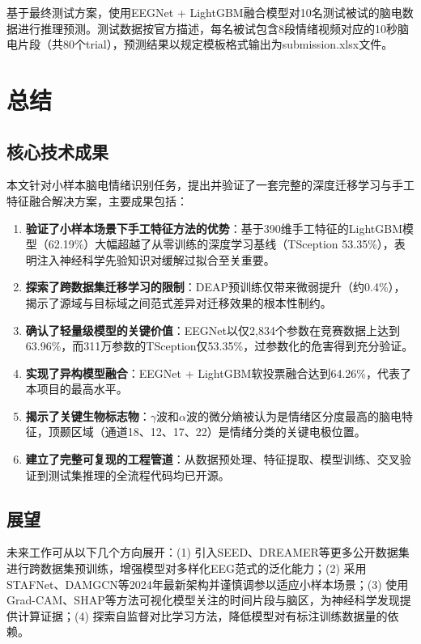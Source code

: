 \documentclass[UTF8,zihao=-4,fontset=fandol]{ctexart}
\numberwithin{equation}{section}
\numberwithin{figure}{section}
\numberwithin{table}{section}
\begin{document}
基于最终测试方案，使用EEGNet + LightGBM融合模型对10名测试被试的脑电数据进行推理预测。测试数据按官方描述，每名被试包含8段情绪视频对应的10秒脑电片段（共80个trial），预测结果以规定模板格式输出为submission.xlsx文件。

\section{总结}

\subsection{核心技术成果}

本文针对小样本脑电情绪识别任务，提出并验证了一套完整的深度迁移学习与手工特征融合解决方案，主要成果包括：

\begin{enumerate}
    \item \textbf{验证了小样本场景下手工特征方法的优势}：基于390维手工特征的LightGBM模型（62.19\%）大幅超越了从零训练的深度学习基线（TSception 53.35\%），表明注入神经科学先验知识对缓解过拟合至关重要。
    \item \textbf{探索了跨数据集迁移学习的限制}：DEAP预训练仅带来微弱提升（约0.4\%），揭示了源域与目标域之间范式差异对迁移效果的根本性制约。
    \item \textbf{确认了轻量级模型的关键价值}：EEGNet以仅2,834个参数在竞赛数据上达到63.96\%，而311万参数的TSception仅53.35\%，过参数化的危害得到充分验证。
    \item \textbf{实现了异构模型融合}：EEGNet + LightGBM软投票融合达到64.26\%，代表了本项目的最高水平。
    \item \textbf{揭示了关键生物标志物}：$\gamma$波和$\alpha$波的微分熵被认为是情绪区分度最高的脑电特征，顶颞区域（通道18、12、17、22）是情绪分类的关键电极位置。
    \item \textbf{建立了完整可复现的工程管道}：从数据预处理、特征提取、模型训练、交叉验证到测试集推理的全流程代码均已开源。
\end{enumerate}

\subsection{展望}

未来工作可从以下几个方向展开：(1) 引入SEED、DREAMER等更多公开数据集进行跨数据集预训练，增强模型对多样化EEG范式的泛化能力；(2) 采用STAFNet、DAMGCN等2024年最新架构并谨慎调参以适应小样本场景；(3) 使用Grad-CAM、SHAP等方法可视化模型关注的时间片段与脑区，为神经科学发现提供计算证据；(4) 探索自监督对比学习方法，降低模型对有标注训练数据量的依赖。
\end{document}
